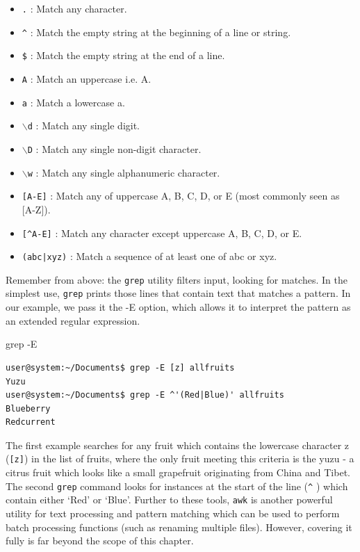\documentclass[11pt]{article}
\begin{document}
\begin{itemize}
\item \texttt{.} : Match any character.
\item \texttt{\^{}} : Match the empty string at the beginning of a line or string.
\item \texttt{\$} : Match the empty string at the end of a line.
\item \texttt{A} : Match an uppercase i.e. A.
\item \texttt{a} : Match a lowercase a.
\item \texttt{$\backslash$d} : Match any single digit.
\item \texttt{$\backslash$D} : Match any single non-digit character.
\item \texttt{$\backslash$w} : Match any single alphanumeric character.
\item \texttt{[A-E]} : Match any of uppercase A, B, C, D, or E (most commonly seen as [A-Z]).
\item \texttt{[\^{}A-E]} : Match any character except uppercase A, B, C, D, or E.
\item \texttt{(abc|xyz)} : Match a sequence of at least one of abc or xyz. 
\end{itemize}

Remember from above: the \texttt{grep} utility filters input, looking for matches. In the simplest use, \texttt{grep} prints those lines that contain text that matches a pattern. In our example, we pass it the -E option, which allows it to interpret the pattern as an extended regular expression.\\

\begin{listing}[H]
\caption{grep -E}\vspace{-0.1in}
\begin{verbatim}
user@system:~/Documents$ grep -E [z] allfruits
Yuzu
user@system:~/Documents$ grep -E ^'(Red|Blue)' allfruits
Blueberry
Redcurrent
\end{verbatim}
\end{listing}

The first example searches for any fruit which contains the lowercase character z (\texttt{[z]})  in the list of fruits, where the only fruit meeting this criteria is the yuzu - a citrus fruit which looks like a small grapefruit originating from China and Tibet. The second \texttt{grep} command looks for instances at the start of the line (\texttt{\^}{ } ) which contain either `Red' or `Blue'.  Further to these tools, \texttt{awk} is another powerful utility for text processing and pattern matching which can be used to perform batch processing functions (such as renaming multiple files). However, covering it fully is far beyond the scope of this chapter.
\end{document}

